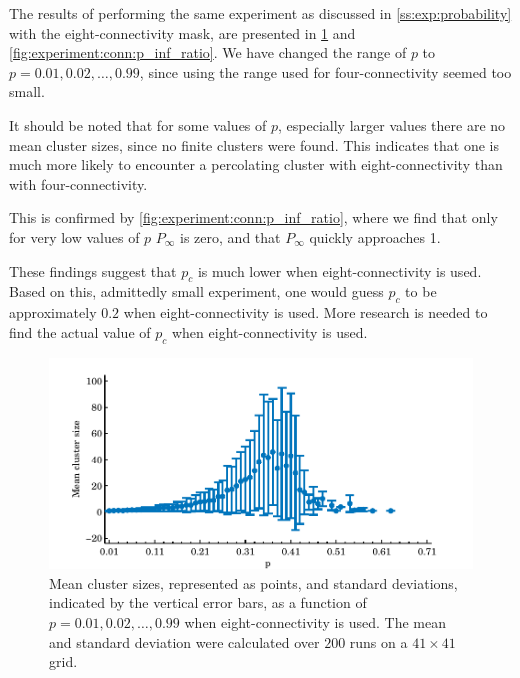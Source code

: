 The results of performing the same experiment as discussed in \cref{ss:exp:probability} with the eight-connectivity mask, are presented in \cref{fig:experiment:conn:mean_std_clusters} and \ref{fig:experiment:conn:p_inf_ratio}. We have changed the range of $p$ to $p = 0.01, 0.02, \dotsc, 0.99$, since using the range used for four-connectivity seemed too small.

It should be noted that for some values of $p$, especially larger values there are no mean cluster sizes, since no finite clusters were found. This indicates that one is much more likely to encounter a percolating cluster with eight-connectivity than with four-connectivity. 

This is confirmed by \cref{fig:experiment:conn:p_inf_ratio}, where we find that only for very low values of $p$ $P_\infty$ is zero, and that $P_\infty$ quickly approaches 1. 

These findings suggest that $p_c$ is much lower when eight-connectivity is used. Based on this, admittedly small experiment, one would guess $p_c$ to be approximately $0.2$ when eight-connectivity is used. More research is needed to find the actual value of $p_c$ when eight-connectivity is used.\\

\begin{figure}
	\centering
	\includegraphics[width=\textwidth]{./img/assignment_d_mean_std_p.pdf}
	\caption{Mean cluster sizes, represented as points, and standard deviations, indicated by the vertical error bars, as a function of $p = 0.01, 0.02, \dotsc, 0.99$ when eight-connectivity is used. The mean and standard deviation were calculated over $200$ runs on a $41 \times 41$ grid.}
	\label{fig:experiment:conn:mean_std_clusters}
\end{figure}

